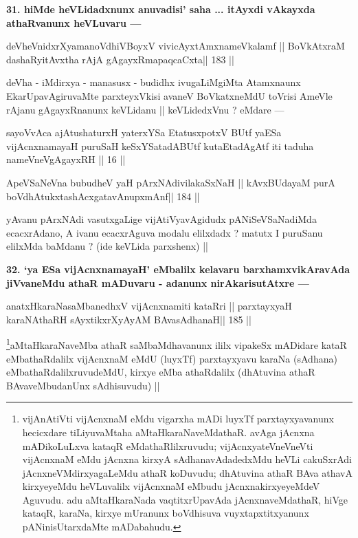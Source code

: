 \begin{artha}
{\bf 31. hiMde heVLidadxnunx anuvadisi' saha ... itAyxdi vAkayxda athaRvanunx heVLuvaru ---}
\end{artha}

\begin{shl}
deVheVnidxrXyamanoVdhiVBoyxV vivicAyx\s\s tAmxnameVkalamf ||
BoVkAtxraM dashaRyitAvx\s tha rAjA gAgayxRmapaqcaCxta\hfill || 183 ||
\end{shl}

\begin{artha}
deVha - iMdirxya - manasusx - budidhx ivugaLiMgiMta Atamxnaunx EkarUpavAgiruvaMte parxteyxVkisi avaneV BoVkatxneMdU toVrisi AmeVle rAjanu gAgayxRnanunx keVLidanu || keVLidedxVnu ? eMdare ---
\end{artha}

\begin{shl}
sayoVvAca ajAtushaturxH yaterxYSa EtatusxpotxV\s
BUtf yaESa vijAcnxnamayaH puruSaH keSxYSatadABUtf
kutaEtadAgAtf iti taduha nameVneVgAgayxRH || 16 ||
\end{shl}

\begin{shl}
ApeVSaNeVna bubudheV yaH pArxNAdivilakaSxNaH ||
kAvxBUdayaM purA boVdhAtukxtashAcx\s\s gatavAnupxmAnf\hfill || 184 ||
\end{shl}

\begin{artha}
yAvanu pArxNAdi vasutxgaLige vijAtiVyavAgidudx pANiSeVSaNadiMda ecacxrAdano, A ivanu ecacxrAguva modalu elilxdadx ? matutx I puruSanu elilxMda baMdanu ? (ide keVLida parxshenx) ||
\end{artha}

\begin{artha}
{\bf 32. `ya ESa vijAcnxnamayaH' eMbalilx kelavaru barxhamxvikAravAda jiVvaneMdu athaR mADuvaru - adanunx nirAkarisutAtxre ---}
\end{artha}

\begin{shl}
anatxHkaraNasaMbanedhxV vijAcnxnamiti kataRri ||
parxtayxyaH karaNAthaRH sAyxtikxrXyAyAM BAvasAdhanaH\hfill || 185 ||
\end{shl}

\begin{artha}
\footnote{vijAnAtiVti vijAcnxnaM eMdu vigarxha mADi luyxTf parxtayxyavanunx hecicxdare tiLiyuvaMtaha aMtaHkaraNaveMdathaR. avAga jAcnxna mADikoLuLxva kataqR eMdathaRlilxruvudu; vijAcnxyateV\s neVneVti vijAcnxnaM eMdu jAcnxna kirxyA sAdhanavAdadedxMdu heVLi cakuSxrAdi jAcnxneVMdirxyagaLeMdu athaR koDuvudu; dhAtuvina athaR BAva athavA kirxyeyeMdu heVLuvalilx vijAcnxnaM eMbudu jAcnxnakirxyeyeMdeV Aguvudu. adu aMtaHkaraNada vaqtitxrUpavAda jAcnxnaveMdathaR, hiVge kataqR, karaNa, kirxye mUranunx boVdhisuva vuyxtapxtitxyanunx pANinisUtarxdaMte mADabahudu.}aMtaHkaraNaveMba athaR saMbaMdhavanunx ililx vipakeSx mADidare kataR eMbathaRdalilx vijAcnxnaM eMdU (luyxTf) parxtayxyavu karaNa (sAdhana) eMbathaRdalilxruvudeMdU, kirxye eMba athaRdalilx (dhAtuvina athaR BAvaveMbudanUnx sAdhisuvudu) ||
\end{artha}

